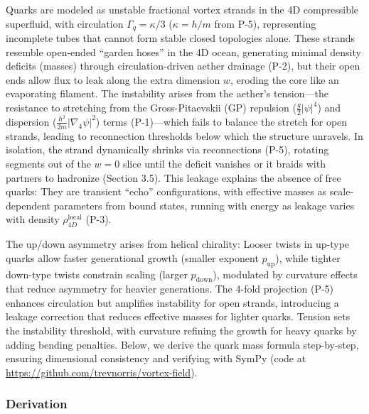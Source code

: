 Quarks are modeled as unstable fractional vortex strands in the 4D compressible superfluid, with circulation $\Gamma_q = \kappa / 3$ ($\kappa = h / m$ from P-5), representing incomplete tubes that cannot form stable closed topologies alone. These strands resemble open-ended ``garden hoses'' in the 4D ocean, generating minimal density deficits (masses) through circulation-driven aether drainage (P-2), but their open ends allow flux to leak along the extra dimension $w$, eroding the core like an evaporating filament. The instability arises from the aether's tension---the resistance to stretching from the Gross-Pitaevskii (GP) repulsion ($\frac{g}{2} |\psi|^4$) and dispersion ($\frac{\hbar^2}{2m} |\nabla_4 \psi|^2$) terms (P-1)---which fails to balance the stretch for open strands, leading to reconnection thresholds below which the structure unravels. In isolation, the strand dynamically shrinks via reconnections (P-5), rotating segments out of the $w=0$ slice until the deficit vanishes or it braids with partners to hadronize (Section 3.5). This leakage explains the absence of free quarks: They are transient ``echo'' configurations, with effective masses as scale-dependent parameters from bound states, running with energy as leakage varies with density $\rho_{4D}^{\text{local}}$ (P-3).

The up/down asymmetry arises from helical chirality: Looser twists in up-type quarks allow faster generational growth (smaller exponent $p_{\text{up}}$), while tighter down-type twists constrain scaling (larger $p_{\text{down}}$), modulated by curvature effects that reduce asymmetry for heavier generations. The 4-fold projection (P-5) enhances circulation but amplifies instability for open strands, introducing a leakage correction that reduces effective masses for lighter quarks. Tension sets the instability threshold, with curvature refining the growth for heavy quarks by adding bending penalties. Below, we derive the quark mass formula step-by-step, ensuring dimensional consistency and verifying with SymPy (code at \url{https://github.com/trevnorris/vortex-field}).

\subsubsection{Derivation}

